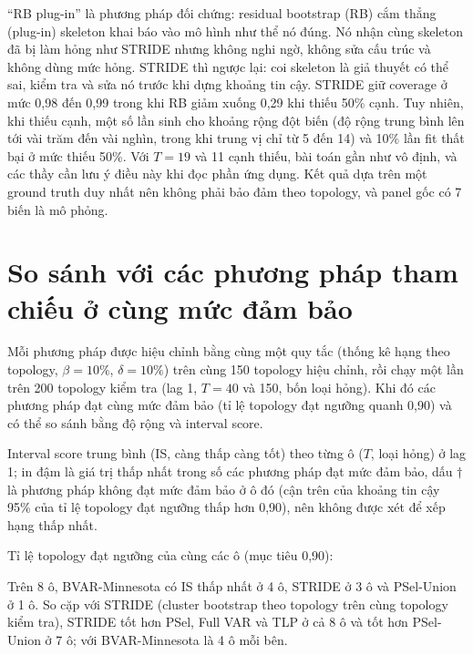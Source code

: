 \documentclass[11pt,a4paper]{article}
\begin{document}
``RB plug-in'' là phương pháp đối chứng: residual bootstrap (RB) cắm thẳng (plug-in) skeleton khai báo vào mô hình như thể nó đúng. Nó nhận cùng skeleton đã bị làm hỏng như STRIDE nhưng không nghi ngờ, không sửa cấu trúc và không dùng mức hỏng. STRIDE thì ngược lại: coi skeleton là giả thuyết có thể sai, kiểm tra và sửa nó trước khi dựng khoảng tin cậy. STRIDE giữ coverage ở mức 0,98 đến 0,99 trong khi RB giảm xuống 0,29 khi thiếu 50\% cạnh. Tuy nhiên, khi thiếu cạnh, một số lần sinh cho khoảng rộng đột biến (độ rộng trung bình lên tới vài trăm đến vài nghìn, trong khi trung vị chỉ từ 5 đến 14) và 10\% lần fit thất bại ở mức thiếu 50\%. Với $T=19$ và 11 cạnh thiếu, bài toán gần như vô định, và các thầy cần lưu ý điều này khi đọc phần ứng dụng. Kết quả dựa trên một ground truth duy nhất nên không phải bảo đảm theo topology, và panel gốc có 7 biến là mô phỏng.

\section{So sánh với các phương pháp tham chiếu ở cùng mức đảm bảo}

Mỗi phương pháp được hiệu chỉnh bằng cùng một quy tắc (thống kê hạng theo topology, $\beta=10\%$, $\delta=10\%$) trên cùng 150 topology hiệu chỉnh, rồi chạy một lần trên 200 topology kiểm tra (lag 1, $T=40$ và 150, bốn loại hỏng). Khi đó các phương pháp đạt cùng mức đảm bảo (tỉ lệ topology đạt ngưỡng quanh 0,90) và có thể so sánh bằng độ rộng và interval score.

Interval score trung bình (IS, càng thấp càng tốt) theo từng ô ($T$, loại hỏng) ở lag 1; in đậm là giá trị thấp nhất trong số các phương pháp đạt mức đảm bảo, dấu \(\dagger\) là phương pháp không đạt mức đảm bảo ở ô đó (cận trên của khoảng tin cậy 95\% của tỉ lệ topology đạt ngưỡng thấp hơn 0,90), nên không được xét để xếp hạng thấp nhất.



Tỉ lệ topology đạt ngưỡng của cùng các ô (mục tiêu 0,90):



Trên 8 ô, BVAR-Minnesota có IS thấp nhất ở 4 ô, STRIDE ở 3 ô và PSel-Union ở 1 ô. So cặp với STRIDE (cluster bootstrap theo topology trên cùng topology kiểm tra), STRIDE tốt hơn PSel, Full VAR và TLP ở cả 8 ô và tốt hơn PSel-Union ở 7 ô; với BVAR-Minnesota là 4 ô mỗi bên.
\end{document}
